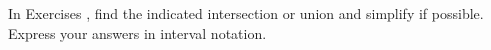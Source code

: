 {\noindent In Exercises}
{, find the indicated intersection or union and simplify if possible. Express your answers in interval notation.}
